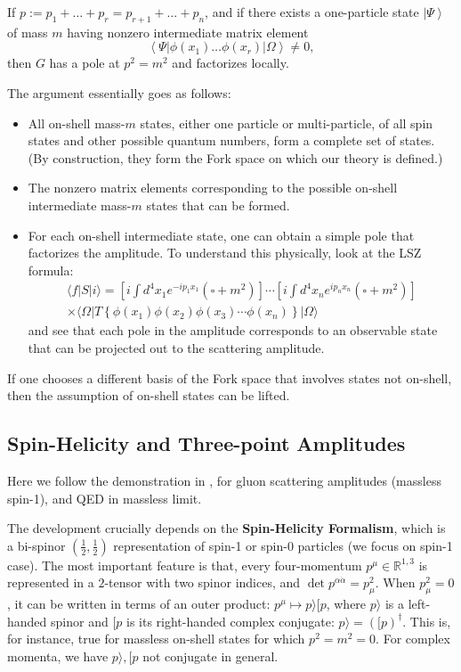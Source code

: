 \begin{theorem}
	If $p := p_1 + \ldots + p_r = p_{r + 1} + \ldots + p_n$, and if there exists a one-particle state $\left| \Psi \right\rangle $ of mass $m$ having nonzero intermediate matrix element
	\[
		\left\langle \Psi \right| \phi(x_1) \ldots \phi(x_r) \left| \Omega \right\rangle \neq 0
	,\] 
	then $G$ has a pole at $p^2 = m^2$ and factorizes locally.
\end{theorem}
The argument essentially goes as follows:
\begin{itemize}
	\item All on-shell mass-$m$ states, either one particle or multi-particle, of all spin states and other possible quantum numbers, form a complete set of states.
	(By construction, they form the Fork space on which our theory is defined.)
	\item The nonzero matrix elements corresponding to the possible on-shell intermediate mass-$m$ states that can be formed.
	\item For each on-shell intermediate state, one can obtain a simple pole that factorizes the amplitude. To understand this physically, look at the LSZ formula:
\[
\begin{array}{r}
\langle f| S|i\rangle=\left[i \int d^4 x_1 e^{-i p_1 x_1}\left(\square+m^2\right)\right] \cdots\left[i \int d^4 x_n e^{i p_n x_n}\left(\square+m^2\right)\right] \\
\times\langle\Omega| T\left\{\phi\left(x_1\right) \phi\left(x_2\right) \phi\left(x_3\right) \cdots \phi\left(x_n\right)\right\}|\Omega\rangle
\end{array}
\]
	and see that each pole in the amplitude corresponds to an observable state that can be projected out to the scattering amplitude.
\end{itemize}

\followup If one chooses a different basis of the Fork space that involves states not on-shell, then the assumption of on-shell states can be lifted.

\subsection{Spin-Helicity and Three-point Amplitudes}

Here we follow the demonstration in \autocite[Chapter~27.6]{schwartzQFT2014}, for gluon scattering amplitudes (massless spin-1), and QED in massless limit.

The development crucially depends on the \textbf{Spin-Helicity Formalism}, which is a bi-spinor $\left( \frac{1}{2}, \frac{1}{2} \right) $ representation of spin-1 or spin-0 particles (we focus on spin-1 case). The most important feature is that, every four-momentum $p^\mu \in \mathbb{R}^{1,3}$ is represented in a $2$-tensor with two spinor indices, and $\operatorname{det } p^{\alpha \dot{\alpha}} = p_\mu^2$. When $p_{\mu}^2 = 0$, it can be written in terms of an outer product:
$p^\mu \mapsto p \rangle  [p $, where $p \rangle$ is a left-handed spinor and $[p$ is its right-handed complex conjugate:  $p \rangle = \left( [p \right) ^\dag$. This is, for instance, true for massless on-shell states for which $p^2 = m^2 = 0$.
For complex momenta, we have $p \rangle, [p$ not conjugate in general.

